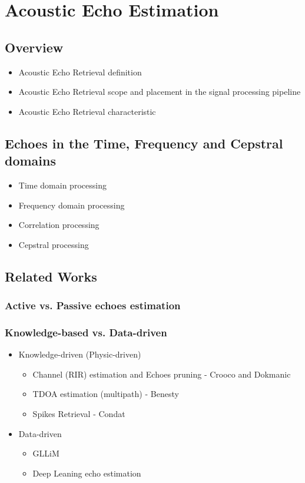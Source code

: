 \chapter{Acoustic Echo Estimation}\label{chap:estimation}

\section{Overview}
\begin{itemize}
    \item Acoustic Echo Retrieval definition
    \item Acoustic Echo Retrieval scope and placement in the signal processing pipeline
    \item Acoustic Echo Retrieval characteristic
\end{itemize}

\section{Echoes in the Time, Frequency and Cepstral domains}
\begin{itemize}
    \item Time domain processing
    \item Frequency domain processing
    \item Correlation processing
    \item Cepstral processing
\end{itemize}


\section{Related Works}
\subsection{Active vs. Passive echoes estimation}

\subsection{Knowledge-based vs. Data-driven}
\begin{itemize}
    \item Knowledge-driven (Physic-driven)
    \begin{itemize}
        \item Channel (RIR) estimation and Echoes pruning - Crooco and Dokmanic
        \item TDOA estimation (multipath) - Benesty
        \item Spikes Retrieval - Condat
    \end{itemize}
    \item Data-driven
    \begin{itemize}
        \item GLLiM
        \item Deep Leaning echo estimation
    \end{itemize}
\end{itemize}

